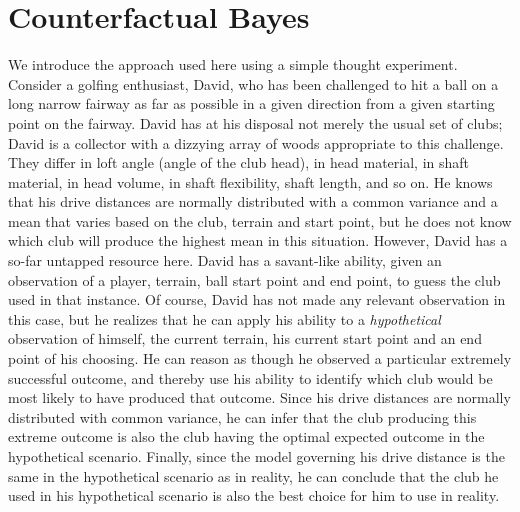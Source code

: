 \documentclass[12pt]{article}
\begin{document}
%
\section{Counterfactual Bayes}\label{counterfactual_bayes}
%
We introduce the approach used here using a simple thought experiment.
%
Consider a golfing enthusiast, David, who has been challenged to hit a ball on a long narrow fairway as far as possible in a given direction from a given starting point on the fairway. 
%
David has at his disposal not merely the usual set of clubs; David is a collector with a dizzying array of woods appropriate to this challenge.
%
They differ in loft angle (angle of the club head), in head material, in shaft material, in head volume, in shaft flexibility, shaft length, and so on. 
%
He knows that his drive distances are normally distributed with a common variance and a mean that varies based on the club, terrain and start point, but he does not know which club will produce the highest mean in this situation.
%
%
However, David has a so-far untapped resource here.
%
David has a savant-like ability, given an observation of a player, terrain, ball start point and end point, to guess the club used in that instance. 
%
Of course, David has not made any relevant observation in this case, but he realizes that he can apply his ability to a \textit{hypothetical} observation of himself, the current terrain, his current start point and an end point of his choosing. 
%
He can reason as though he observed a particular extremely successful outcome, and thereby use his ability to identify which club would be most likely to have produced that outcome.
%
Since his drive distances are normally distributed with common variance, he can infer that the club producing this extreme outcome is also the club having the optimal expected outcome in the hypothetical scenario.
%
Finally, since the model governing his drive distance is the same in the hypothetical scenario as in reality, he can conclude that the club he used in his hypothetical scenario is also the best choice for him to use in reality.
%
\end{document}

